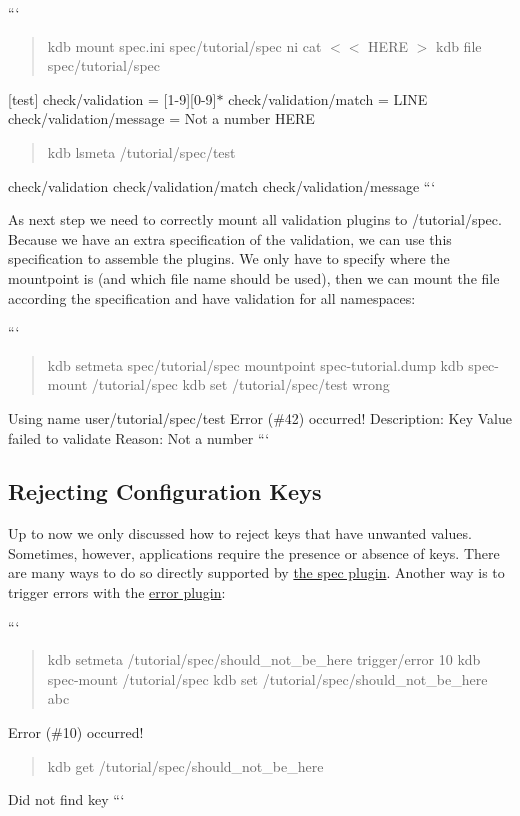 ``` \begin{quote}
kdb mount spec.\+ini spec/tutorial/spec ni cat $<$$<$ H\+E\+R\+E $>$ {\ttfamily kdb file spec/tutorial/spec} \end{quote}
\mbox{[}test\mbox{]} check/validation = \mbox{[}1-\/9\mbox{]}\mbox{[}0-\/9\mbox{]}$\ast$ check/validation/match = L\+I\+N\+E check/validation/message = Not a number H\+E\+R\+E \begin{quote}
kdb lsmeta /tutorial/spec/test \end{quote}
check/validation check/validation/match check/validation/message ```

As next step we need to correctly mount all validation plugins to {\ttfamily /tutorial/spec}. Because we have an extra specification of the validation, we can use this specification to assemble the plugins. We only have to specify where the mountpoint is (and which file name should be used), then we can mount the file according the specification and have validation for all namespaces\+:

``` \begin{quote}
kdb setmeta spec/tutorial/spec mountpoint spec-\/tutorial.\+dump kdb spec-\/mount /tutorial/spec kdb set /tutorial/spec/test wrong \end{quote}
Using name user/tutorial/spec/test Error (\#42) occurred! Description\+: Key Value failed to validate Reason\+: Not a number ```

\subsection*{Rejecting Configuration Keys}

Up to now we only discussed how to reject keys that have unwanted values. Sometimes, however, applications require the presence or absence of keys. There are many ways to do so directly supported by \hyperlink{md_src_plugins_spec_README_src_plugins_spec_README_md}{the spec plugin}. Another way is to trigger errors with the \hyperlink{md_src_plugins_error_README_src_plugins_error_README_md}{error plugin}\+:

``` \begin{quote}
kdb setmeta /tutorial/spec/should\+\_\+not\+\_\+be\+\_\+here trigger/error 10 kdb spec-\/mount /tutorial/spec kdb set /tutorial/spec/should\+\_\+not\+\_\+be\+\_\+here abc \end{quote}
Error (\#10) occurred! \begin{quote}
kdb get /tutorial/spec/should\+\_\+not\+\_\+be\+\_\+here \end{quote}
Did not find key ```


